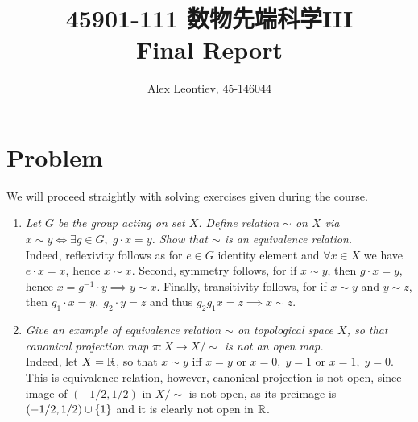 \documentclass[10pt]{article} %
\title{45901-111 数物先端科学III\\Final Report}
\author{Alex Leontiev, 45-146044}
\begin{document}
\begin{CJK}{UTF8}{bsmi}
\maketitle
\end{CJK}
\section{Problem}
We will proceed straightly with solving exercises given during the course.
\begin{enumerate}[1. ]
\item\textit{Let $G$ be the group acting on set $X$. Define relation $\sim$ on $X$ via $x\sim y\iff \exists g\in G,\;g\cdot x=y$. Show that
$\sim$ is an equivalence relation.}\\
Indeed, reflexivity follows as for $e\in G$ identity element and $\forall x\in X$ we have $e\cdot x=x$, hence $x\sim x$. Second, symmetry
follows, for if $x\sim y$, then $g\cdot x=y$, hence $x=g^{-1}\cdot y\implies y\sim x$. Finally, transitivity follows, for if $x\sim y$ and $y\sim z$,
then $g_1\cdot x=y,\;g_2\cdot y=z$ and thus $g_2g_1x=z\implies x\sim z$.

\item\textit{Give an example of equivalence relation $\sim$ on topological space $X$, so that canonical projection map $\pi:X\to X/\sim$ is not
an open map.}\\
Indeed, let $X=\mathbb{R}$, so that $x\sim y$ iff $x=y$ or $x=0,\;y=1$ or $x=1,\;y=0$. This is equivalence relation, however, canonical projection
is not open, since image of $(-1/2,1/2)$ in $X/\sim$ is not open, as its preimage is $(-1/2,1/2)\cup\left\{1\right\}$ and it is clearly not open in $\mathbb{R}$.


\end{enumerate}
\end{document}
